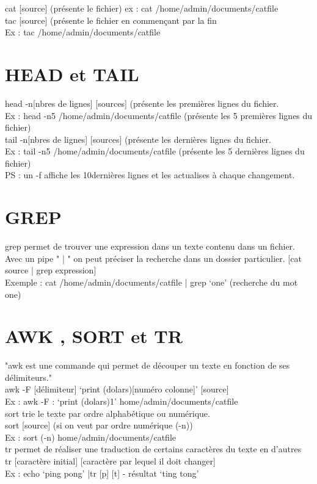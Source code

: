 \documentclass[11pt,a4peper]{article}
\begin{document}
cat [source] (présente le fichier) ex : cat /home/admin/documents/catfile\\
tac [source] (présente le fichier en commençant par la fin \\
 Ex : tac /home/admin/documents/catfile
 
 \section{HEAD et TAIL}
 
head -n[nbres de lignes] [sources] (présente les premières lignes du fichier.\\
Ex : head -n5 /home/admin/documents/catfile (présente les 5 premières lignes du fichier)\\
tail -n[nbres de lignes] [sources] (présente les dernières lignes du fichier.\\
Ex : tail -n5 /home/admin/documents/catfile (présente les 5 dernières lignes du fichier)\\
PS : un -f affiche les 10dernières lignes et les actualises à chaque changement.\\

\section{GREP}

grep permet de trouver une expression dans un texte contenu dans un fichier.\\
Avec un pipe " | " on peut préciser la recherche dans un dossier particulier. [cat source | grep expression]\\
Exemple : cat /home/admin/documents/catfile | grep ‘one’  (recherche du mot one)

\section{AWK , SORT et TR}

"awk est une commande qui permet de découper un texte en fonction de ses délimiteurs."\\
awk -F [délimiteur] ‘{print (dolars)[numéro colonne]}’ [source]\\
Ex : awk -F : ‘{print (dolars)1}’ home/admin/documents/catfile\\
sort trie le texte par ordre alphabétique ou numérique.\\
 sort [source] (si on veut par ordre numérique (-n))\\
Ex : sort (-n) home/admin/documents/catfile\\
tr permet de réaliser une traduction de certains caractères du texte en d’autres \\
tr [caractère initial] [caractère par lequel il doit changer]\\
Ex : echo ‘ping pong’ |tr [p] [t] - résultat ‘ting tong’\\
\end{document}
